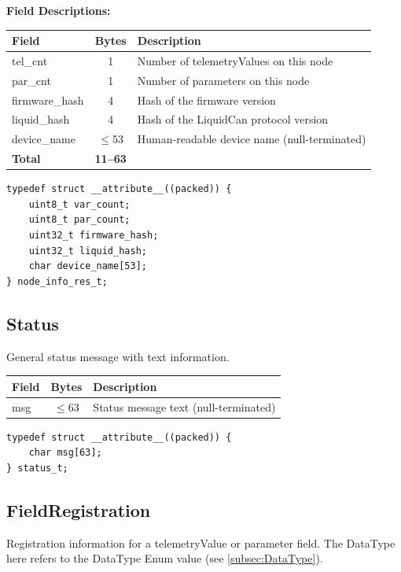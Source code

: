\textbf{Field Descriptions:}

\begin{center}
\begin{tabular}{l c l}
\toprule
Field & Bytes & Description \\
\midrule
tel\_cnt & 1 & Number of telemetryValues on this node \\
par\_cnt & 1 & Number of parameters on this node \\
firmware\_hash & 4 & Hash of the firmware version \\
liquid\_hash & 4 & Hash of the LiquidCan protocol version \\
device\_name & $\leq$53 & Human-readable device name (null-terminated) \\
\midrule
\textbf{Total} & \textbf{11--63} & \\
\bottomrule
\end{tabular}
\end{center}


\begin{lstlisting}[caption={NodeInfoRes struct}]
typedef struct __attribute__((packed)) {
    uint8_t var_count;
    uint8_t par_count;
    uint32_t firmware_hash;
    uint32_t liquid_hash;
    char device_name[53];
} node_info_res_t;
\end{lstlisting}

\subsection{Status}\label{struct:Status}
General status message with text information.

\begin{center}
\begin{tabular}{l c l}
\toprule
Field & Bytes & Description \\
\midrule
msg & $\leq$63 & Status message text (null-terminated) \\
\bottomrule
\end{tabular}
\end{center}


\begin{lstlisting}[caption={Status struct}]
typedef struct __attribute__((packed)) {
    char msg[63];
} status_t;
\end{lstlisting}

\subsection{FieldRegistration}\label{struct:FieldRegistration}
Registration information for a telemetryValue or parameter field.
The DataType here refers to the DataType Enum value (see \ref{subsec:DataType}).

